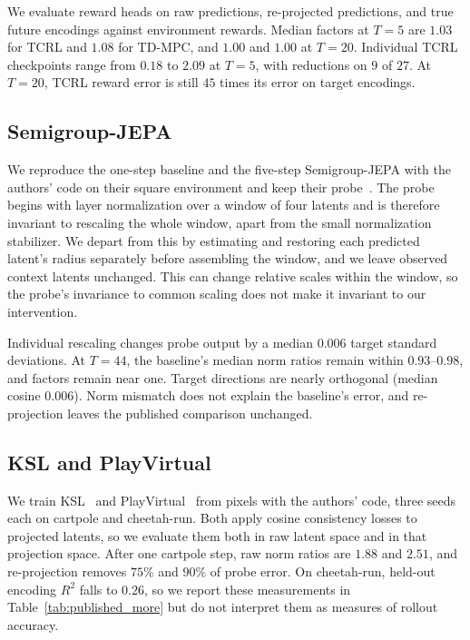 We evaluate reward heads on raw predictions, re-projected predictions, and true future encodings against environment rewards. Median factors at $T=5$ are $1.03$ for TCRL and $1.08$ for TD-MPC, and $1.00$ and $1.00$ at $T=20$. Individual TCRL checkpoints range from $0.18$ to $2.09$ at $T=5$, with reductions on $9$ of $27$. At $T=20$, TCRL reward error is still $45$ times its error on target encodings.

\subsection{Semigroup-JEPA}
\label{app:sgjepa}
We reproduce the one-step baseline and the five-step Semigroup-JEPA with the authors' code on their square environment and keep their probe~\citep{Liu2026SemigroupJEPA}. The probe begins with layer normalization over a window of four latents and is therefore invariant to rescaling the whole window, apart from the small normalization stabilizer. We depart from this by estimating and restoring each predicted latent's radius separately before assembling the window, and we leave observed context latents unchanged. This can change relative scales within the window, so the probe's invariance to common scaling does not make it invariant to our intervention.

Individual rescaling changes probe output by a median $0.006$ target standard deviations. At $T=44$, the baseline's median norm ratios remain within $0.93$--$0.98$, and factors remain near one. Target directions are nearly orthogonal (median cosine $0.006$). Norm mismatch does not explain the baseline's error, and re-projection leaves the published comparison unchanged.

\subsection{KSL and PlayVirtual}
\label{app:ksl}
\label{app:playvirtual}
We train KSL~\citep{mcinroe2021learning} and PlayVirtual~\citep{yu2021playvirtual} from pixels with the authors' code, three seeds each on cartpole and cheetah-run. Both apply cosine consistency losses to projected latents, so we evaluate them both in raw latent space and in that projection space. After one cartpole step, raw norm ratios are $1.88$ and $2.51$, and re-projection removes $75$\% and $90$\% of probe error. On cheetah-run, held-out encoding $R^2$ falls to $0.26$, so we report these measurements in Table~\ref{tab:published_more} but do not interpret them as measures of rollout accuracy.

